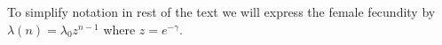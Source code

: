 \documentclass[bimj,fleqn]{w-art}
\theoremstyle{plain}
\theoremstyle{definition}
\begin{document}
To simplify notation in rest of the text we will express the female fecundity by $\lambda(n)=\lambda_0 z^{n-1}$ where $z=e^{-\gamma}$.




\end{document}
